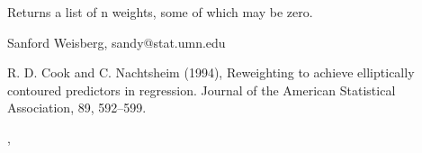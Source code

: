 \begin{Value}
Returns a list of n weights, some of which may be zero.\end{Value}
\begin{Author}\relax
Sanford Weisberg, sandy@stat.umn.edu\end{Author}
\begin{References}\relax
R. D. Cook and C. Nachtsheim (1994), Reweighting to achieve
elliptically contoured predictors in regression.  Journal of the American
Statistical Association, 89, 592--599.\end{References}
\begin{SeeAlso}\relax
{}, \end{SeeAlso}

